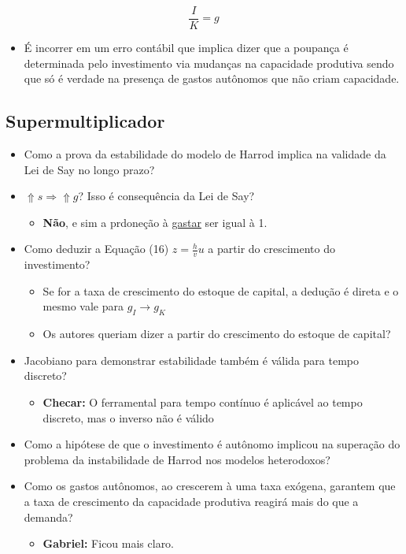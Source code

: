 \documentclass[]{article}
\providecommand{\tightlist}{%
  \setlength{\itemsep}{0pt}\setlength{\parskip}{0pt}}
\begin{document}
\begin{equation}
\frac{I}{K} = g
\end{equation}

\begin{itemize}
\tightlist
\item
  É incorrer em um erro contábil que implica dizer que a poupança é
  determinada pelo investimento via mudanças na capacidade produtiva
  sendo que só é verdade na presença de gastos autônomos que não criam
  capacidade.
\end{itemize}

\subsection{Supermultiplicador}\label{supermultiplicador}

\begin{itemize}
\item
  [\done] Como a prova da estabilidade do modelo de Harrod implica na
  validade da Lei de Say no longo prazo?
\item
  [\done] \(\Uparrow s \Rightarrow \Uparrow g\)? Isso é consequência da
  Lei de Say?
  \begin{itemize}
      \item \textbf{Não}, e sim a prdoneção à \underline{gastar} ser igual à 1.
  \end{itemize}
\item
  [\open] Como deduzir a Equação (16) \(z=\frac{h}{v}u\) a partir do
  crescimento do investimento?

  \begin{itemize}
  \tightlist
  \item
    Se for a taxa de crescimento do estoque de capital, a dedução é
    direta e o mesmo vale para \(g_I \to g_K\)
  \item
    Os autores queriam dizer a partir do crescimento do estoque de
    capital?
  \end{itemize}
\item
  [\open] Jacobiano para demonstrar estabilidade também é válida para
  tempo discreto?

  \begin{itemize}
  \tightlist
  \item
    [\open] \textbf{Checar:} O ferramental para tempo contínuo é
    aplicável ao tempo discreto, mas o inverso não é válido
  \end{itemize}
\item
  [\done] Como a hipótese de que o investimento é autônomo implicou na
  superação do problema da instabilidade de Harrod nos modelos
  heterodoxos?
\item
  [\done] Como os gastos autônomos, ao crescerem à uma taxa exógena,
  garantem que a taxa de crescimento da capacidade produtiva reagirá
  mais do que a demanda?
  \begin{itemize}
      \item \textbf{Gabriel:} Ficou mais claro. 
  \end{itemize}
\end{itemize}
\end{document}
